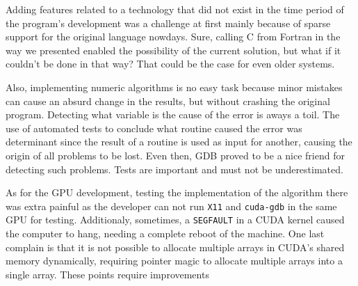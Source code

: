 Adding features related to a technology that did not exist in the time period of the program's 
development was a challenge at first mainly because of sparse support for the original language nowdays. 
Sure, calling C from Fortran in the way we presented enabled the possibility of the current solution, 
but what if it couldn't be done in that way? That could be the case for even older systems.

Also, implementing numeric algorithms is no easy task because minor mistakes can cause an absurd change 
in the results, but without crashing the original program. Detecting what variable is the cause of the 
error is aways a toil. The use of automated tests to conclude what routine caused the error was determinant 
since the result of a routine is used as input for another, causing the origin of all problems to be lost. 
Even then, GDB proved to be a nice friend for detecting such problems. Tests are important and must 
not be underestimated.

As for the GPU development, testing the implementation of the algorithm there was extra painful as the developer 
can not run \texttt{X11} and \texttt{cuda-gdb} in the same GPU for testing. Additionaly, sometimes, 
a \texttt{SEGFAULT} in a CUDA kernel caused the computer to hang, needing a complete reboot of the machine. 
One last complain is that it is not possible to allocate multiple arrays in CUDA's shared memory dynamically, 
requiring pointer magic to allocate multiple arrays into a single array. These points require improvements 



